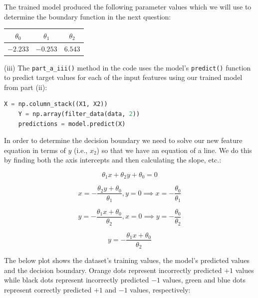 \documentclass[12pt]{article}
\begin{document}
The trained model produced the following parameter values which we will use to determine the boundary function in the next question:

\begin{center}
    \begin{tabular}{|c|c|c|}
        \hline
        $\theta_0$ & $\theta_1$ & $\theta_2$ \\
        \hline
        $-2.233$ & $-0.253$ & $6.543$ \\
        \hline
    \end{tabular}
\end{center}

\noindent (iii) The \texttt{part\_a\_iii()} method in the code uses the model's \texttt{predict()} function to predict target values for each of the input features using our trained model from part (ii):

\begin{center}
    \lstset{basicstyle=\footnotesize}
    \begin{lstlisting}[language=Python]
    X = np.column_stack((X1, X2))
    Y = np.array(filter_data(data, 2))
    predictions = model.predict(X)
    \end{lstlisting}
\end{center}

In order to determine the decision boundary we need to solve our new feature equation in terms of $y$ (i.e., $x_2$) so that we have an equation of a line. We do this by finding both the axis intercepts and then calculating the slope, etc.:

$$\theta_1x + \theta_2y + \theta_0 = 0$$

$$x = -\frac{\theta_2y + \theta_0}{\theta_1}, y = 0 \implies x = -\frac{\theta_0}{\theta_1}$$

$$y = -\frac{\theta_1x + \theta_0}{\theta_2}, x = 0 \implies y = -\frac{\theta_0}{\theta_2}$$

$$y = -\frac{\theta_1x + \theta_0}{\theta_2}$$

The below plot shows the dataset's training values, the model's predicted values and the decision boundary. Orange dots represent incorrectly predicted $+1$ values while black dots represent incorrectly predicted $-1$ values, green and blue dots represent correctly predicted $+1$ and $-1$ values, respectively:
\end{document}
